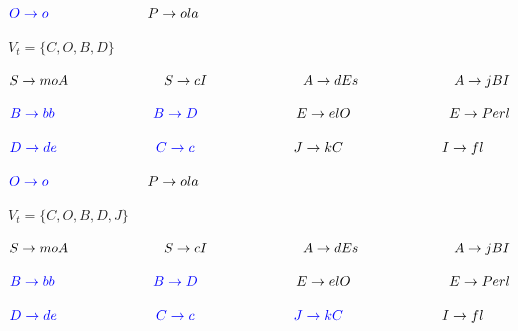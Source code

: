 $ \textcolor{blue}{ O \rightarrow o } \hspace{2.5cm} P \rightarrow ola$ \newline \newline

$ V_{t} = \{ C,O,B,D \} $ \newline

$ S \rightarrow moA \hspace{2.5cm} S \rightarrow cI \hspace{2.5cm} A \rightarrow  dEs \hspace{2.5cm} A \rightarrow  jBI $ \newline

$ \textcolor{blue}{ B \rightarrow bb } \hspace{2.5cm} \textcolor{blue}{ B \rightarrow D } \hspace{2.5cm} E \rightarrow  elO\hspace{2.5cm} E \rightarrow  Perl$ \newline

$ \textcolor{blue}{ D \rightarrow de } \hspace{2.5cm} \textcolor{blue}{ C \rightarrow c} \hspace{2.5cm} J \rightarrow  kC\hspace{2.5cm} I \rightarrow  fl$ \newline

$ \textcolor{blue}{ O \rightarrow o } \hspace{2.5cm} P \rightarrow ola$ \newline \newline

$ V_{t} = \{ C,O,B,D,J \} $ \newline

$ S \rightarrow moA \hspace{2.5cm} S \rightarrow cI \hspace{2.5cm} A \rightarrow  dEs \hspace{2.5cm} A \rightarrow  jBI $ \newline

$ \textcolor{blue}{ B \rightarrow bb } \hspace{2.5cm} \textcolor{blue}{ B \rightarrow D } \hspace{2.5cm} E \rightarrow  elO\hspace{2.5cm} E \rightarrow  Perl$ \newline

$ \textcolor{blue}{ D \rightarrow de } \hspace{2.5cm} \textcolor{blue}{ C \rightarrow c} \hspace{2.5cm} \textcolor{blue}{ J \rightarrow  kC } \hspace{2.5cm} I \rightarrow  fl$ \newline

